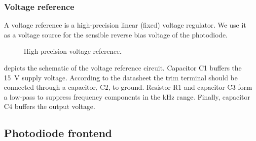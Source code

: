 \subsubsection{Voltage reference}

A voltage reference is a high-precision linear (fixed) voltage regulator.
We use it as a voltage source for the sensible reverse bias voltage of the photodiode.
\begin{figure}[H]
	\centering
	
	\caption{High-precision voltage reference.}\label{fig:voltage_reference}
\end{figure}
 depicts the schematic of the voltage reference circuit.
Capacitor C1 buffers the \SI{15}{\volt} supply voltage.
According to the datasheet the trim terminal should be connected through a capacitor, C2, to ground.
Resistor R1 and capacitor C3 form a low-pass to suppress frequency components in the kHz range.
Finally, capacitor C4 buffers the output voltage.

\subsection{Photodiode frontend}

